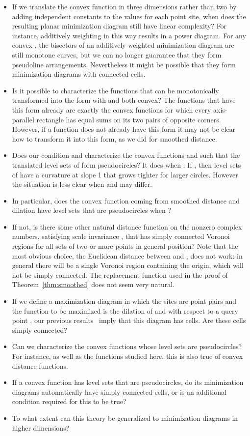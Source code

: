 \documentclass[10pt, conference, compsocconf]{IEEEtran}
\begin{document}
\begin{itemize}
\item If we translate the convex function  in three dimensions rather than two by adding independent constants to the values for each point site, when does the resulting planar minimization diagram still have linear complexity? For instance, additively weighting  in this way results in a power diagram. For any convex , the bisectors of an additively weighted minimization diagram are still monotone curves, but we can no longer guarantee that they form pseudoline arrangements. Nevertheless it might be possible that they form minimization diagrams with connected cells.
\item Is it possible to characterize the functions that can be monotonically transformed into the form  with  and  both convex? The functions that have this form already are exactly the convex functions for which every axis-parallel rectangle has equal sums on its two pairs of opposite corners. However, if a function does not already have this form it may not be clear how to transform it into this form, as we did for smoothed distance.
\item Does our condition  and  characterize the convex functions  and  such that the translated level sets of  form pseudocircles? It does when : If , then level sets of  have a curvature at slope 1 that grows tighter for larger circles. However the situation is less clear when  and  may differ.
\item In particular, does the convex function  coming from smoothed distance and dilation have level sets that are pseudocircles when ?
\item If not, is there some other natural distance function  on the nonzero complex numbers, satisfying scale invariance , that has simply connected Voronoi regions for all sets of two or more points in general position? Note that the most obvious choice, the Euclidean distance between  and , does not work: in general there will be a single Voronoi region containing the origin, which will not be simply connected. The replacement function used in the proof of Theorem~\ref{thm:smoothed} does not seem very natural.
\item If we define a maximization diagram in which the sites are point pairs  and the function to be maximized is the dilation  of  and  with respect to a query point , our previous results~\cite{EppWor-CGTA-07} imply that this diagram has  cells. Are these cells simply connected?
\item Can we characterize the convex functions whose level sets are pseudocircles? For instance, as well as the functions  studied here, this is also true of convex distance functions.
\item If a convex function has level sets that are pseudocircles, do its minimization diagrams automatically have simply connected cells, or is an additional condition required for this to be true?
\item To what extent can this theory be generalized to minimization diagrams in higher dimensions?
\end{itemize}
\end{document}

